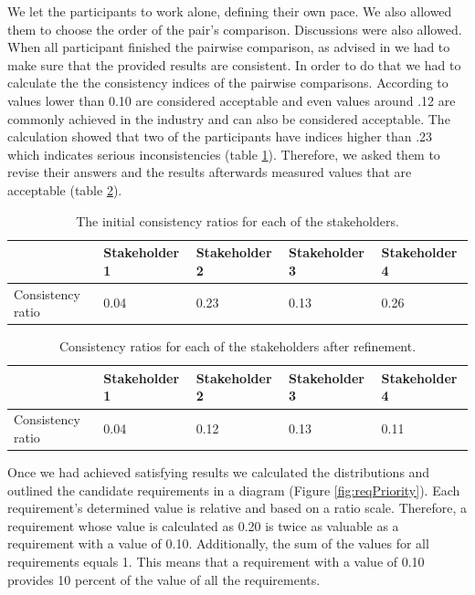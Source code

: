 We let the participants to work alone, defining their own pace. We also allowed them to choose the order of the pair's comparison. Discussions were also allowed. When all participant finished the pairwise comparison, as advised in \cite{karlsson1997cost} we had to make sure that the provided results are consistent. In order to do that we had to calculate the the consistency indices of the pairwise comparisons. According to \cite{karlsson1997cost} values lower than 0.10 are considered acceptable and even values around .12 are commonly achieved in the industry and can also be considered acceptable. The calculation showed that two of the participants have indices higher than .23 which indicates serious inconsistencies (table \ref{tbl:reqInitialConsist}). Therefore, we asked them to revise their answers and the results afterwards measured values that are acceptable (table \ref{tbl:reqFinalConsist}).
 
 \begin{table}[h!]
  \begin{center}
    \begin{tabular}{| l | l | l | l | l |}
    \hline
    & Stakeholder 1 & Stakeholder 2 & Stakeholder 3 & Stakeholder 4 \\	 \hline
    Consistency ratio & 0.04 & 0.23 & 0.13 & 0.26 \\
    \hline
    \end{tabular}
  \end{center}
  \caption{The initial consistency ratios for each of the stakeholders.}
  \label{tbl:reqInitialConsist}
\end{table}


 \begin{table}[h!]
  \begin{center}
    \begin{tabular}{| l | l | l | l | l |}
    \hline
    & Stakeholder 1 & Stakeholder 2 & Stakeholder 3 & Stakeholder 4 \\	 \hline
    Consistency ratio & 0.04 & 0.12 & 0.13 & 0.11 \\
    \hline
    \end{tabular}
  \end{center}
  \caption{Consistency ratios for each of the stakeholders after refinement.}
  \label{tbl:reqFinalConsist}
\end{table}

Once we had achieved satisfying results we calculated the distributions and outlined the candidate requirements in a diagram (Figure \ref{fig:reqPriority}). Each requirement's determined value is relative and based on a ratio scale. Therefore, a requirement whose value is calculated as 0.20 is twice as valuable as a requirement with a value of 0.10. Additionally, the sum of the values for all requirements equals 1. This means that a requirement with a value of 0.10 provides 10 percent of the value of all the requirements.

